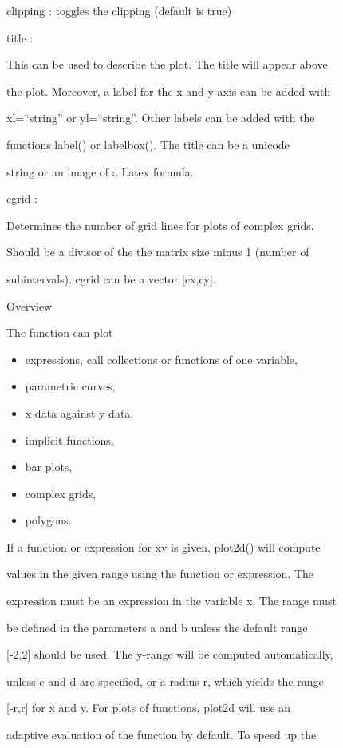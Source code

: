 \documentclass[
]{book}
\begin{document}
clipping : toggles the clipping (default is true)

title :

This can be used to describe the plot. The title will appear above

the plot. Moreover, a label for the x and y axis can be added with

xl=``string'' or yl=``string''. Other labels can be added with the

functions label() or labelbox(). The title can be a unicode

string or an image of a Latex formula.

cgrid :

Determines the number of grid lines for plots of complex grids.

Should be a divisor of the the matrix size minus 1 (number of

subintervals). cgrid can be a vector {[}cx,cy{]}.

Overview

The function can plot

\begin{itemize}
\item
  expressions, call collections or functions of one variable,
\item
  parametric curves,
\item
  x data against y data,
\item
  implicit functions,
\item
  bar plots,
\item
  complex grids,
\item
  polygons.
\end{itemize}

If a function or expression for xv is given, plot2d() will compute

values in the given range using the function or expression. The

expression must be an expression in the variable x. The range must

be defined in the parameters a and b unless the default range

{[}-2,2{]} should be used. The y-range will be computed automatically,

unless c and d are specified, or a radius r, which yields the range

{[}-r,r{]} for x and y. For plots of functions, plot2d will use an

adaptive evaluation of the function by default. To speed up the
\end{document}
